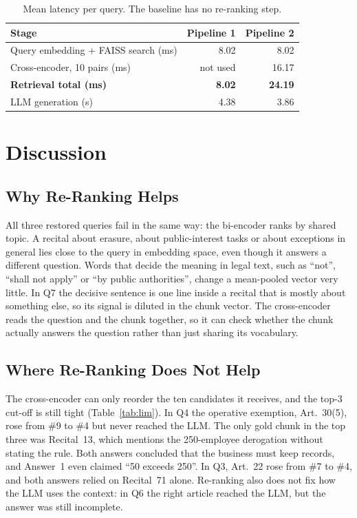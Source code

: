 \documentclass[10pt,a4paper]{article}
\begin{document}
\begin{table}[H]
\centering
\caption{Mean latency per query. The baseline has no re-ranking step.}
\label{tab:lat}
\begin{tabularx}{0.75\linewidth}{@{}L r r@{}}
\toprule
Stage & Pipeline 1 & Pipeline 2 \\
\midrule
Query embedding + FAISS search (ms) & 8.02 & 8.02 \\
Cross-encoder, 10 pairs (ms) & not used & 16.17 \\
\textbf{Retrieval total (ms)} & \textbf{8.02} & \textbf{24.19} \\
LLM generation (s) & 4.38 & 3.86 \\
\bottomrule
\end{tabularx}
\end{table}

\section{Discussion}

\subsection{Why Re-Ranking Helps}
All three restored queries fail in the same way: the bi-encoder ranks by shared topic.
A recital about erasure, about public-interest tasks or about exceptions in general lies close
to the query in embedding space, even though it answers a different question. Words that
decide the meaning in legal text, such as ``not'', ``shall not apply'' or ``by public
authorities'', change a mean-pooled vector very little. In Q7 the decisive sentence is one
line inside a recital that is mostly about something else, so its signal is diluted in the
chunk vector. The cross-encoder reads the question and the chunk together, so it can check
whether the chunk actually answers the question rather than just sharing its vocabulary.

\subsection{Where Re-Ranking Does Not Help}
The cross-encoder can only reorder the ten candidates it receives, and the top-3 cut-off is
still tight (Table~\ref{tab:lim}). In Q4 the operative exemption, Art.~30(5), rose from \#9 to
\#4 but never reached the LLM. The only gold chunk in the top three was Recital~13, which
mentions the 250-employee derogation without stating the rule. Both answers concluded that
the business must keep records, and Answer~1 even claimed ``50 exceeds 250''. In Q3, Art.~22
rose from \#7 to \#4, and both answers relied on Recital~71 alone. Re-ranking also does not
fix how the LLM uses the context: in Q6 the right article reached the LLM, but the answer
was still incomplete.
\end{document}

